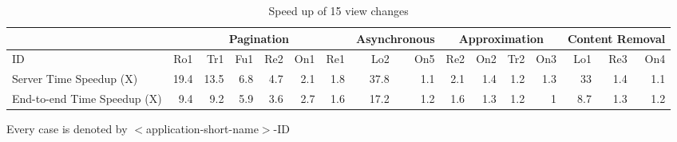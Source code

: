 \begin{table*}[h]
\centering
\caption{Speed up of 15 view changes}
\label{tab:speedup}
\begin{tabular}{@{}l|rrrrrr|rr|rrrr|rrr@{}}
\toprule
&	\multicolumn{6}{|c|}{Pagination}	&	\multicolumn{2}{c|}{	Asynchronous}	&	\multicolumn{4}{c|}{Approximation}	&	\multicolumn{3}{c}{Content	Removal}	\\	\midrule																													
ID	&	Ro1	&	Tr1	&	Fu1	&	Re2	&	On1	&	Re1	&	Lo2	&	On5	&	Re2	&	On2	&	Tr2	&	On3	&	Lo1	&	Re3	&	On4					\\	\midrule				
Server Time Speedup (X)	&	19.4	&	13.5	&	6.8	&	4.7	&	2.1	&	1.8	&	37.8	&	1.1	&	2.1	&	1.4	&	1.2	&	1.3	&	33	&	1.4	&	1.1					\\	\midrule				
End-to-end Time Speedup (X)	&	9.4	&	9.2	&	5.9	&	3.6	&	2.7	&	1.6	&	17.2	&	1.2	&	1.6	&	1.3	&	1.2	&	1	&	8.7	&	1.3	&	1.2					\\					
\bottomrule
\end{tabular}

{Every case is denoted by $<$application-short-name$>$-ID}
\end{table*}

